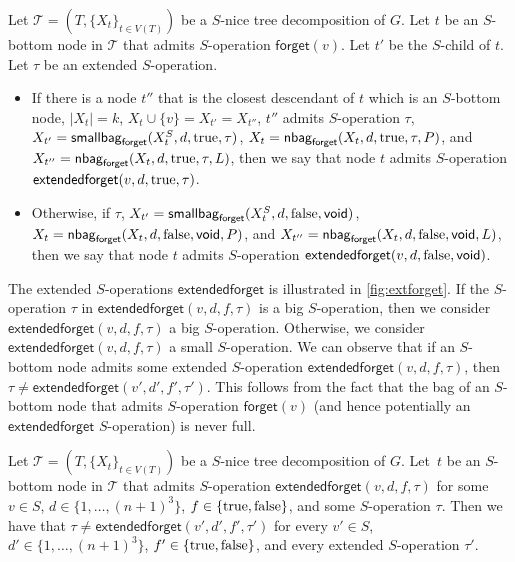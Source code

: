 \documentclass[a4paper,UKenglish,cleveref, autoref, thm-restate, numberwithinsect]{lipics-v2021}
\newcommand{\forget}{\mathsf{forget}}
\newcommand{\extendedforget}{\mathsf{extendedforget}}
\newcommand{\void}{\mathsf{void}}
\newcommand{\nbagf}{\mathsf{nbag}_{\mathsf{forget}}}
\newcommand{\smallbagf}{\mathsf{smallbag}_{\mathsf{forget}}}
\newcommand{\true}{\textup{true}}
\newcommand{\false}{\textup{false}}
\newcommand{\slim}{\text{slim}\xspace}
\begin{document}
\begin{definition}[$\extendedforget$]\label{def:extendedforget}
    Let $\mathcal{T}=(T,\{X_t\}_{t\in V(T)})$ be a \slim $S$-nice tree decomposition of $G$. Let $t$ be an $S$-bottom node in $\mathcal{T}$ that admits $S$-operation $\forget(v)$. Let $t'$ be the $S$-child of $t$. 
Let $\tau$ be an extended $S$-operation.
    \begin{itemize}
\item If there is a node $t''$ that is the closest descendant of $t$ which is an $S$-bottom node, $|X_t|=k$, $X_t\cup\{v\}=X_{t'}=X_{t''}$, $t''$ admits $S$-operation $\tau$, $X_{t'}=\smallbagf(X^S_t,d,\true,\tau)$, $X_{t}=\nbagf(X_t,d,\true,\tau,P)$, and $X_{t''}=\nbagf(X_t,d,\true,\tau,L)$,
        then we say that node $t$ admits $S$-operation $\extendedforget(v,d,\true,\tau)$. 
        \item Otherwise, if $\tau$, $X_{t'}=\smallbagf(X^S_t,d,\false,\void)$, $X_{t}=\nbagf(X_t,d,\false,\void,P)$, and $X_{t''}=\nbagf(X_t,d,\false,\void,L)$, then we say that node $t$ admits $S$-operation $\extendedforget(v,d,\false,\void)$.
\end{itemize}
\end{definition}

The extended $S$-operations $\extendedforget$ is illustrated in \cref{fig:extforget}.
If the $S$-operation $\tau$ in $\extendedforget(v,d,f,\tau)$ is a big $S$-operation, then we consider $\extendedforget(v,d,f,\tau)$ a big $S$-operation. Otherwise, we consider $\extendedforget(v,d,f,\tau)$ a small $S$-operation.
We can observe that if an $S$-bottom node admits some extended $S$-operation $\extendedforget(v,d,f,\tau)$, then $\tau\neq\extendedforget(v',d',f',\tau')$. This follows from the fact that the bag of an $S$-bottom node that admits $S$-operation $\forget(v)$ (and hence potentially an $\extendedforget$ $S$-operation) is never full.
\begin{observation}
 Let $\mathcal{T}=(T,\{X_t\}_{t\in V(T)})$ be a \slim $S$-nice tree decomposition of $G$. 
Let~$t$ be an $S$-bottom node in $\mathcal{T}$ that admits $S$-operation $\extendedforget(v,d,f,\tau)$ for some $v\in S$, $d\in \{1,\ldots,(n+1)^3\}$, $f\in\{\true,\false\}$, and some $S$-operation $\tau$. Then we have that $\tau\neq\extendedforget(v',d',f',\tau')$ for every $v'\in S$, $d'\in \{1,\ldots,(n+1)^3\}$, $f'\in\{\true,\false\}$, and every extended $S$-operation $\tau'$.
\end{observation}
\end{document}
